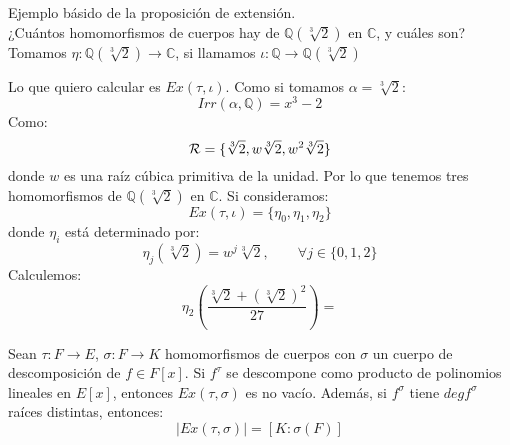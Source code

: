 \begin{ejemplo}
    Ejemplo básido de la proposición de extensión.\\

    \noindent
    ¿Cuántos homomorfismos de cuerpos hay de $\mathbb{Q}(\sqrt[3]{2})$ en $\mathbb{C}$, y cuáles son?\\

    \noindent
    Tomamos $\eta:\mathbb{Q}(\sqrt[3]{2})\to \mathbb{C}$, si llamamos $\iota:\mathbb{Q}\to \mathbb{Q}(\sqrt[3]{2})$
    \begin{figure}[H]
        \centering
    \end{figure}
    Lo que quiero calcular es $Ex(\tau,\iota)$. Como si tomamos $\alpha=\sqrt[3]{2}$:
    \begin{equation*}
        Irr(\alpha,\mathbb{Q}) = x^3-2
    \end{equation*}
    Como:
    \begin{equation*}
        \mathcal{R} = \{\sqrt[3]{2}, w\sqrt[3]{2}, w^2\sqrt[3]{2}\}
    \end{equation*}
    donde $w$ es una raíz cúbica primitiva de la unidad. Por lo que tenemos tres homomorfismos de $\mathbb{Q}(\sqrt[3]{2})$ en $\mathbb{C}$. Si consideramos:
    \begin{equation*}
        Ex(\tau,\iota) = \{\eta_0,\eta_1,\eta_2\}
    \end{equation*}
    donde $\eta_i$ está determinado por:
    \begin{equation*}
        \eta_j(\sqrt[3]{2}) = w^j \sqrt[3]{2}, \qquad \forall j \in \{0,1,2\}
    \end{equation*}
    Calculemos:
    \begin{equation*}
        \eta_2\left(\frac{{\sqrt[3]{2}+(\sqrt[3]{2})}^{2}}{27}\right) = 
    \end{equation*} %
\end{ejemplo}

\begin{prop}
    Sean $\tau:F\to E$, $\sigma:F\to K$ homomorfismos de cuerpos con $\sigma$ un cuerpo de descomposición de $f\in F[x]$. Si $f^\tau$ se descompone como producto de polinomios lineales en $E[x]$, entonces $Ex(\tau,\sigma)$ es no vacío. Además, si $f^\sigma$ tiene $deg f^\sigma$ raíces distintas, entonces:
    \begin{equation*}
        |Ex(\tau, \sigma)| = [K:\sigma(F)]
    \end{equation*}
\end{prop}

